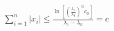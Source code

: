 \documentclass[preview]{standalone}
\begin{document}
\begin{align*}
\sum_{i=1}^n |x_i| \leq \frac{\ln\left[\left(\frac{\lambda_1}{\lambda_0}\right)^n c_0\right]}{\lambda_1 - \lambda_0} = c
\end{align*}
\end{document}
